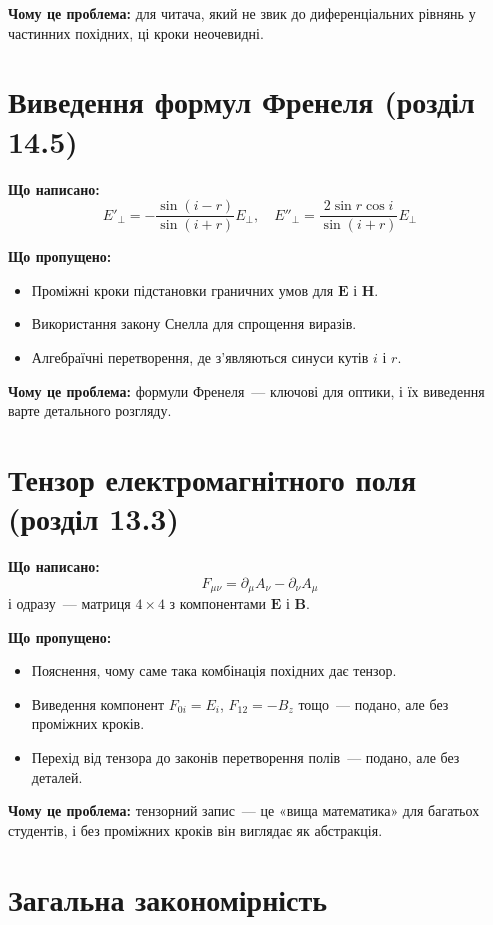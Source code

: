 \documentclass[11pt,a4paper]{article}
\begin{document}
\textbf{Чому це проблема:} для читача, який не звик до диференціальних рівнянь у частинних похідних, ці кроки неочевидні.

\section{Виведення формул Френеля (розділ 14.5)}

\textbf{Що написано:}
\[
E'_\perp = -\frac{\sin(i-r)}{\sin(i+r)} E_\perp, \quad E''_\perp = \frac{2\sin r \cos i}{\sin(i+r)} E_\perp
\]

\textbf{Що пропущено:}
\begin{itemize}[nosep]
    \item Проміжні кроки підстановки граничних умов для \(\mathbf{E}\) і \(\mathbf{H}\).
    \item Використання закону Снелла для спрощення виразів.
    \item Алгебраїчні перетворення, де з'являються синуси кутів \(i\) і \(r\).
\end{itemize}

\textbf{Чому це проблема:} формули Френеля~--- ключові для оптики, і їх виведення варте детального розгляду.

\section{Тензор електромагнітного поля (розділ 13.3)}

\textbf{Що написано:}
\[
F_{\mu\nu} = \partial_\mu A_\nu - \partial_\nu A_\mu
\]
і одразу~--- матриця \(4 \times 4\) з компонентами \(\mathbf{E}\) і \(\mathbf{B}\).

\textbf{Що пропущено:}
\begin{itemize}[nosep]
    \item Пояснення, чому саме така комбінація похідних дає тензор.
    \item Виведення компонент \(F_{0i} = E_i\), \(F_{12} = -B_z\) тощо~--- подано, але без проміжних кроків.
    \item Перехід від тензора до законів перетворення полів~--- подано, але без деталей.
\end{itemize}

\textbf{Чому це проблема:} тензорний запис~--- це «вища математика» для багатьох студентів, і без проміжних кроків він виглядає як абстракція.

\section{Загальна закономірність}
\end{document}
